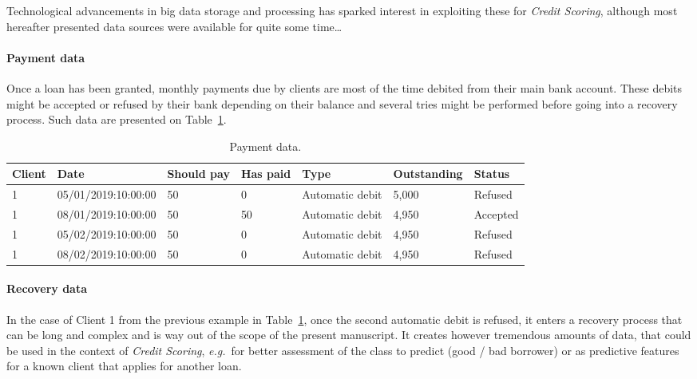 Technological advancements in big data storage and processing has sparked interest in exploiting these for \textit{Credit Scoring}, although most hereafter presented data sources were available for quite some time\dots

\paragraph{Payment data}

Once a loan has been granted, monthly payments due by clients are most of the time debited from their main bank account. These debits might be accepted or refused by their bank depending on their balance and several tries might be performed before going into a recovery process. Such data are presented on Table~\ref{tab:payment_data}.

\begin{table}[ht]
    \centering
    \caption{Payment data.}
    \label{tab:payment_data}
    \begin{small}
\begin{tabular}{lllllll}
Client & Date & Should pay & Has paid & Type & Outstanding & Status \\
 \hline
1 & 05/01/2019:10:00:00 & 50 & 0 & Automatic debit & 5{,}000 & Refused \\
1 & 08/01/2019:10:00:00 & 50 & 50 & Automatic debit & 4{,}950 & Accepted \\
1 & 05/02/2019:10:00:00 & 50 & 0 & Automatic debit & 4{,}950 & Refused \\
1 & 08/02/2019:10:00:00 & 50 & 0 & Automatic debit & 4{,}950 & Refused
\end{tabular}
    \end{small}
\end{table}


\paragraph{Recovery data}

In the case of Client 1 from the previous example in Table~\ref{tab:payment_data}, once the second automatic debit is refused, it enters a recovery process that can be long and complex and is way out of the scope of the present manuscript. It creates however tremendous amounts of data, that could be used in the context of \textit{Credit Scoring}, \textit{e.g.}\ for better assessment of the class to predict (good / bad borrower) or as predictive features for a known client that applies for another loan.

